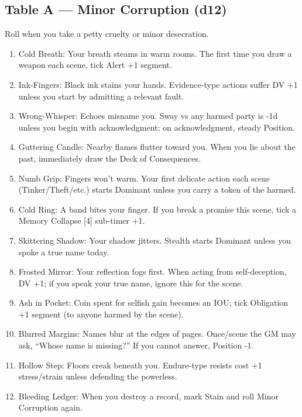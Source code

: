 \documentclass[18pt, letterpaper, twoside]{article}
\newcommand{\corruptiontitle}[1]{\subsection*{#1}}
\begin{document}
\begin{enumerate}
\corruptiontitle{Table A --- Minor Corruption (d12)}
Roll when you take a petty cruelty or minor desecration.
\begin{enumerate}
    \item Cold Breath: Your breath steams in warm rooms. The first time you draw a weapon each scene, tick Alert +1 segment.
    \item Ink-Fingers: Black ink stains your hands. Evidence-type actions suffer DV +1 unless you start by admitting a relevant fault.
    \item Wrong-Whisper: Echoes misname you. Sway vs any harmed party is -1d unless you begin with acknowledgment; on acknowledgment, steady Position.
    \item Guttering Candle: Nearby flames flutter toward you. When you lie about the past, immediately draw the Deck of Consequences.
    \item Numb Grip: Fingers won't warm. Your first delicate action each scene (Tinker/Theft/etc.) starts Dominant unless you carry a token of the harmed.
    \item Cold Ring: A band bites your finger. If you break a promise this scene, tick a Memory Collapse [4] sub-timer +1.
    \item Skittering Shadow: Your shadow jitters. Stealth starts Dominant unless you spoke a true name today.
    \item Frosted Mirror: Your reflection fogs first. When acting from self-deception, DV +1; if you speak your true name, ignore this for the scene.
    \item Ash in Pocket: Coin spent for selfish gain becomes an IOU; tick Obligation +1 segment (to anyone harmed by the scene).
    \item Blurred Margins: Names blur at the edges of pages. Once/scene the GM may ask, ``Whose name is missing?'' If you cannot answer, Position -1.
    \item Hollow Step: Floors creak beneath you. Endure-type resists cost +1 stress/strain unless defending the powerless.
    \item Bleeding Ledger: When you destroy a record, mark Stain and roll Minor Corruption again.
\end{enumerate}


\end{enumerate}
\end{document}
